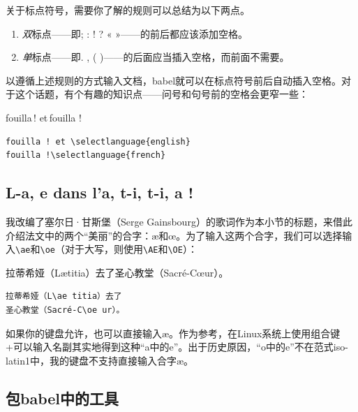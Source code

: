 关于标点符号，需要你了解的规则可以总结为以下两点。

\begin{enumerate}
    \item \emph{双}标点——即; : ! ? « »——的前后都应该添加空格。
    \item \emph{单}标点——即. , ( )——的后面应当插入空格，而前面不需要。
\end{enumerate}

以遵循上述规则的方式输入文档，\textsf{babel}就可以在标点符号前后自动插入空格。对于这个话题，有个有趣的知识点——问号和句号前的空格会更窄一些：

\begin{codelist}[7.1]{
    fouilla\,! et\enspace\,fouilla !
}
\begin{verbatim}
fouilla ! et \selectlanguage{english}
fouilla !\selectlanguage{french}\end{verbatim}
\end{codelist}

\subsection{L-a, e dans l'a, t-i, t-i, a !}

我改编了塞尔日·甘斯堡（Serge Gainsbourg）的歌词作为本小节的标题，来借此介绍法文中的两个``美丽''的合字：æ和œ。为了输入这两个合字，我们可以选择输入\verb|\ae|和\verb+\oe+（对于大写，则使用\verb|\AE|和\verb+\OE+）：

\begin{codelist}[7.2]{
    拉蒂希娅（L\ae titia）去了圣心教堂（Sacré-C\oe ur）。
}
\begin{verbatim}
拉蒂希娅（L\ae titia）去了
圣心教堂（Sacré-C\oe ur）。\end{verbatim}
\end{codelist}

如果你的键盘允许，也可以直接输入æ。作为参考，在Linux系统上使用组合键+可以输入名副其实地得到这种``a中的e''。出于历史原因，``o中的e''不在范式iso-latin1中，我的键盘不支持直接输入合字æ。

\subsection{包\textsf{babel}中的工具}


